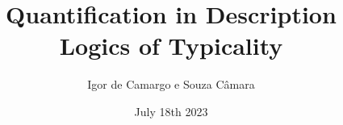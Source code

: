 \documentclass[10pt, xcolor=dvipsnames]{beamer}
\title{Quantification in Description Logics of Typicality}
\date{July 18th 2023}
\author{Igor de Camargo e Souza Câmara}
\institute{University of São Paulo}
\begin{document}
\begin{frame}[plain]
  \titlepage
\end{frame}

%
%

\end{document}
